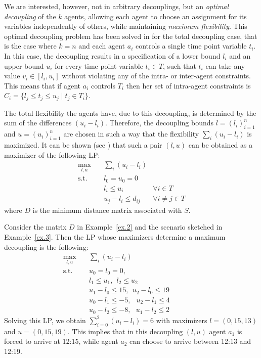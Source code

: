 We are interested, however, not in arbitrary decouplings, but an \emph{optimal decoupling} of the $k$ agents,
allowing each agent to choose an assignment for its variables independently of others, while maintaining \emph{maximum flexibility}. 
This optimal decoupling problem has been solved in \cite{wilson:2013} for the total decoupling case, that is the case where $k=n$ and each agent $a_i$ controls a single time point variable $t_i$. 
In this  case, the decoupling results in a specification of a lower bound $l_i$ and an upper bound $u_i$ for every time point variable $t_i \in T$, such that $t_i$ can take any value $v_i \in [l_i, u_i]$  without violating any of the intra- or inter-agent constraints. This means that if agent $a_i$ controls $T_i$ then
her set of intra-agent constraints is $C_i = \{ l_j \leq t_j \leq u_j \mid t_j \in T_i \}$.

The total flexibility the agents have, due to this decoupling, is determined by the sum of the differences $(u_i - l_i)$.
Therefore, the decoupling bounds  $l = (l_i)^n_{i=1}$ and $u = (u_i)^n_{i=1}$ are chosen in such a way that the flexibility $\sum_i (u_i - l_i)$ is maximized.
It can be shown (see \cite{wilson:2013}) that such a pair $(l, u)$ can be obtained as a maximizer of the following LP:
\begin{align}
\tag{$\TD(D)$}\label{DP}
\max_{l, u }\quad	&	\sum_i (u_i - l_i)	&				\\
\textrm{s.t.}\quad	&	l_0 = u_0 = 0            &          \\
& l_i \leq u_i		&	\forall i \in T	\\
			&	u_j - l_i \leq d_{ij}	&	\forall i \neq j \in T
\end{align}
where $D$ is the minimum distance matrix associated with $S$.
\begin{example}
Consider the matrix $D$ in Example~\ref{ex.2} and the scenario sketched in Example~\ref{ex.3}.
Then the LP whose maximizers determine a maximum decoupling is the following:
\begin{align*}
\max_{l, u}\quad	&	\sum_i (u_i - l_i)	&\  \  \  \  \  \  \   	& \  \  \  \  \ 			\\
\textrm{s.t.}\quad	        &	u_0 = l_0 = 0,  & \\
                                & l_1 \leq u_1, \ \  l_2 \leq u_2 & \\
			        &	u_1 - l_0 \leq 15, \ \ u_2 - l_0 \leq 19 &   \\
			        &      u_ 0 - l_1 \leq -5, \  \ \; u_2 - l_1 \leq 4  &     \\
			        &     u_0 - l_2 \leq -8, \ \ \  u_1 - l_2 \leq 2 &
\end{align*}
Solving this LP, we obtain $\sum^2_{i=0} (u_i - l_i) = 6$ with maximizers $l = (0, 15, 13)$ and $u = (0, 15, 19)$. This implies that in this decoupling $(l, u)$ agent $a_1$ is forced to arrive at 12:15, while agent $a_2$ can choose to arrive between 12:13 and 12:19. \blbox
\end{example}

